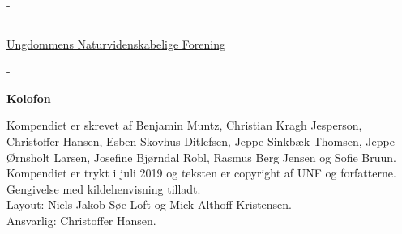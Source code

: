\begin{titlingpage}
\begin{adjustwidth*}{\frontpagecorrection-2cm}{-\frontpagecorrection-2cm}
\begin{table}[h!]
\begin{tabular}{ll}
   
    \end{tabular}
  \end{table}

  \vfill
    
  \fontsize{14pt}{18pt}\selectfont
  \href{http://www.unf.dk/}{Ungdommens Naturvidenskabelige
    Forening}\par
  \end{adjustwidth*}
\end{titlingpage}

\newpage


\begin{adjustwidth*}{\frontpagecorrection}{-\frontpagecorrection}
  \thispagestyle{empty}
  \strut
  \setlength{\parindent}{0pt}
  \addtolength{\parskip}{.6em}

  \vfill
    
  \begin{center}
    \bfseries Kolofon
  \end{center}
 
  \makeatletter
  \edef\fontandleading{\@memptsize.0/\the\baselineskip}
  \makeatother

  \small
   
  \textsl{\thesistitle}
    
  \smallskip
  
 Kompendiet er skrevet af Benjamin Muntz, Christian Kragh Jesperson, Christoffer Hansen, Esben Skovhus Ditlefsen, Jeppe Sinkbæk Thomsen, Jeppe Ørnsholt Larsen, Josefine Bjørndal Robl, Rasmus Berg Jensen og Sofie Bruun. Kompendiet er trykt i juli 2019 og teksten er copyright
   af UNF og forfatterne. Gengivelse med kildehenvisning tilladt. \\
  Layout: Niels Jakob Søe Loft og Mick Althoff Kristensen.\\
  Ansvarlig: Christoffer Hansen.
\end{adjustwidth*}




